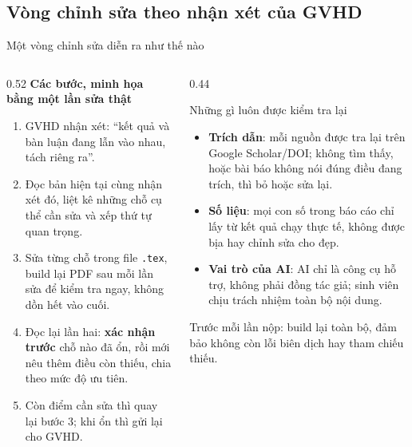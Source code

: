 \subsection{Vòng chỉnh sửa theo nhận xét của GVHD}
\begin{frame}{Một vòng chỉnh sửa diễn ra như thế nào}
  \begin{columns}[t]
    \begin{column}{0.52\textwidth}
      \footnotesize
      \textbf{Các bước, minh họa bằng một lần sửa thật}
      \begin{enumerate}\scriptsize\setlength{\itemsep}{2pt}
        \item GVHD nhận xét: ``kết quả và bàn luận đang lẫn vào nhau, tách riêng ra''.
        \item Đọc bản hiện tại cùng nhận xét đó, liệt kê những chỗ cụ thể cần sửa
          và xếp thứ tự quan trọng.
        \item Sửa từng chỗ trong file \texttt{.tex}, build lại PDF sau mỗi lần sửa
          để kiểm tra ngay, không dồn hết vào cuối.
        \item Đọc lại lần hai: \textbf{xác nhận trước} chỗ nào đã ổn, rồi mới nêu
          thêm điều còn thiếu, chia theo mức độ ưu tiên.
        \item Còn điểm cần sửa thì quay lại bước 3; khi ổn thì gửi lại cho GVHD.
      \end{enumerate}
    \end{column}
    \begin{column}{0.44\textwidth}
      \begin{alertblock}{Những gì luôn được kiểm tra lại}
        \footnotesize
        \begin{itemize}\setlength{\itemsep}{2pt}
          \item \textbf{Trích dẫn}: mỗi nguồn được tra lại trên Google Scholar/DOI;
            không tìm thấy, hoặc bài báo không nói đúng điều đang trích, thì bỏ hoặc sửa lại.
          \item \textbf{Số liệu}: mọi con số trong báo cáo chỉ lấy từ kết quả chạy
            thực tế, không được bịa hay chỉnh sửa cho đẹp.
          \item \textbf{Vai trò của AI}: AI chỉ là công cụ hỗ trợ, không phải đồng
            tác giả; sinh viên chịu trách nhiệm toàn bộ nội dung.
        \end{itemize}
      \end{alertblock}
      \vspace{0.05cm}
      {\scriptsize Trước mỗi lần nộp: build lại toàn bộ, đảm bảo không còn lỗi biên dịch hay tham chiếu thiếu.}
    \end{column}
  \end{columns}
\end{frame}
